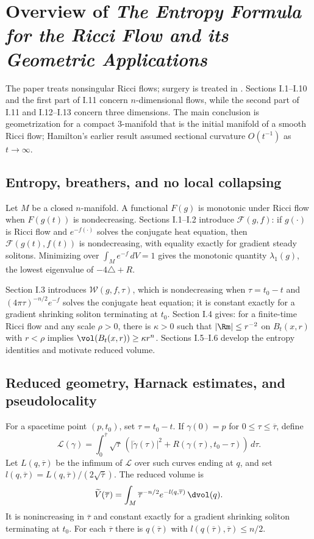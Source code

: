 \section{Overview of
 \emph{The Entropy Formula for the Ricci
Flow and its Geometric
Applications}
\cite{Perelman}}
\label{overview1}

The paper \cite{Perelman} treats nonsingular Ricci flows; surgery is treated
in \cite{Perelman2}.  Sections I.1--I.10 and the first part of I.11 concern
$n$-dimensional flows, while the second part of I.11 and I.12--I.13 concern
three dimensions.  The main conclusion is geometrization for a compact
$3$-manifold that is the initial manifold of a smooth Ricci flow; Hamilton's
earlier result \cite{Hamiltonn} assumed sectional curvature $O(t^{-1})$ as
$t\rightarrow\infty$.

\subsection{Entropy, breathers, and no local collapsing}

Let $M$ be a closed $n$-manifold.  A functional $F(g)$ is monotonic under
Ricci flow when $F(g(t))$ is nondecreasing.  Sections I.1--I.2 introduce
${\mathcal F}(g,f)$: if $g(\cdot)$ is Ricci flow and $e^{-f(\cdot)}$ solves
the conjugate heat equation, then ${\mathcal F}(g(t),f(t))$ is nondecreasing,
with equality exactly for gradient steady solitons.  Minimizing over
$\int_Me^{-f}\,dV=1$ gives the monotonic quantity $\lambda_1(g)$, the lowest
eigenvalue of $-4\triangle+R$.

Section I.3 introduces ${\mathcal W}(g,f,\tau)$, which is nondecreasing when
$\tau=t_0-t$ and $(4\pi\tau)^{-n/2}e^{-f}$ solves the conjugate heat equation;
it is constant exactly for a gradient shrinking soliton terminating at $t_0$.
Section I.4 gives: for a finite-time Ricci flow and any scale $\rho>0$,
there is $\kappa>0$ such that
$|\Rm|\leq r^{-2}$ on $B_t(x,r)$ with $r<\rho$ implies
$\vol(B_t(x,r))\geq\kappa r^n$.  Sections I.5--I.6 develop the entropy
identities and motivate reduced volume.

\subsection{Reduced geometry, Harnack estimates, and pseudolocality}

For a spacetime point $(p,t_0)$, set $\tau=t_0-t$.  If
$\gamma(0)=p$ for $0\leq\tau\leq\overline\tau$, define
\begin{equation}
{\mathcal L}(\gamma)=\int_0^{\overline\tau}\sqrt{\tau}\,
\left(|\dot\gamma(\tau)|^2+R(\gamma(\tau),t_0-\tau)\right)\,d\tau.
\end{equation}
Let $L(q,\overline\tau)$ be the infimum of ${\mathcal L}$ over such curves
ending at $q$, and set
$l(q,\overline\tau)=L(q,\overline\tau)/(2\sqrt{\overline\tau})$.  The
reduced volume is
\[
\widetilde V(\overline\tau)=\int_M\overline\tau^{-n/2}
e^{-l(q,\overline\tau)}\,\dvol(q).
\]
It is nonincreasing in $\overline\tau$ and constant exactly for a gradient
shrinking soliton terminating at $t_0$.  For each $\overline\tau$ there is
$q(\overline\tau)$ with $l(q(\overline\tau),\overline\tau)\leq n/2$.

